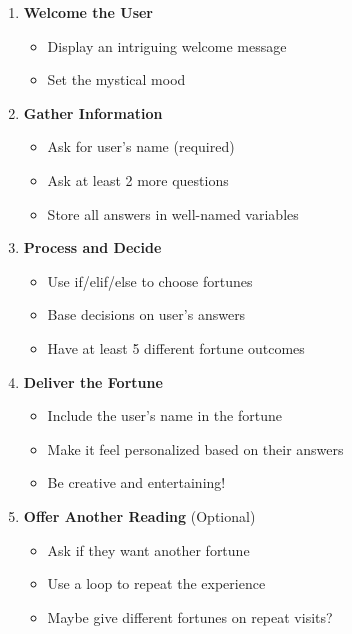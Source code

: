 \documentclass[
  letterpaper,
  DIV=11,
  numbers=noendperiod,
  oneside]{scrreprt}
\providecommand{\tightlist}{%
  \setlength{\itemsep}{0pt}\setlength{\parskip}{0pt}}\usepackage{longtable,booktabs,array}
\begin{document}
\begin{enumerate}
\def\labelenumi{\arabic{enumi}.}
\tightlist
\item
  \textbf{Welcome the User}

  \begin{itemize}
  \tightlist
  \item
    Display an intriguing welcome message
  \item
    Set the mystical mood
  \end{itemize}
\item
  \textbf{Gather Information}

  \begin{itemize}
  \tightlist
  \item
    Ask for user's name (required)
  \item
    Ask at least 2 more questions
  \item
    Store all answers in well-named variables
  \end{itemize}
\item
  \textbf{Process and Decide}

  \begin{itemize}
  \tightlist
  \item
    Use if/elif/else to choose fortunes
  \item
    Base decisions on user's answers
  \item
    Have at least 5 different fortune outcomes
  \end{itemize}
\item
  \textbf{Deliver the Fortune}

  \begin{itemize}
  \tightlist
  \item
    Include the user's name in the fortune
  \item
    Make it feel personalized based on their answers
  \item
    Be creative and entertaining!
  \end{itemize}
\item
  \textbf{Offer Another Reading} (Optional)

  \begin{itemize}
  \tightlist
  \item
    Ask if they want another fortune
  \item
    Use a loop to repeat the experience
  \item
    Maybe give different fortunes on repeat visits?
  \end{itemize}
\end{enumerate}
\end{document}
